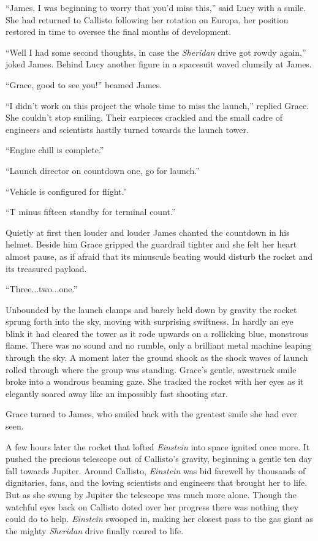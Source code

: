 \documentclass[openany, 12pt]{book} %
\begin{document}
``James, I was beginning to worry that you'd miss this,'' said Lucy with a smile. She had returned to Callisto following her rotation on Europa, her position restored in time to oversee the final months of development.

``Well I had some second thoughts, in case the \textit{Sheridan} drive got rowdy again,'' joked James. Behind Lucy another figure in a spacesuit waved clumsily at James.

``Grace, good to see you!'' beamed James.

``I didn't work on this project the whole time to miss the launch,'' replied Grace. She couldn't stop smiling. Their earpieces crackled and the small cadre of engineers and scientists hastily turned towards the launch tower.

``Engine chill is complete.''

``Launch director on countdown one, go for launch.''

``Vehicle is configured for flight.''

``T minus fifteen standby for terminal count.''

Quietly at first then louder and louder James chanted the countdown in his helmet. Beside him Grace gripped the guardrail tighter and she felt her heart almost pause, as if afraid that its minuscule beating would disturb the rocket and its treasured payload.

``Three...two...one.''

Unbounded by the launch clamps and barely held down by gravity the rocket sprung forth into the sky, moving with surprising swiftness. In hardly an eye blink it had cleared the tower as it rode upwards on a rollicking blue, monstrous flame. There was no sound and no rumble, only a brilliant metal machine leaping through the sky. A moment later the ground shook as the shock waves of launch rolled through where the group was standing. Grace's gentle, awestruck smile broke into a wondrous beaming gaze. She tracked the rocket with her eyes as it elegantly soared away like an impossibly fast shooting star.

Grace turned to James, who smiled back with the greatest smile she had ever seen.

A few hours later the rocket that lofted \textit{Einstein} into space ignited once more. It pushed the precious telescope out of Callisto's gravity, beginning a gentle ten day fall towards Jupiter. Around Callisto, \textit{Einstein} was bid farewell by thousands of dignitaries, fans, and the loving scientists and engineers that brought her to life. But as she swung by Jupiter the telescope was much more alone. Though the watchful eyes back on Callisto doted over her progress there was nothing they could do to help. \textit{Einstein} swooped in, making her closest pass to the gas giant as the mighty \textit{Sheridan} drive finally roared to life.
\end{document}
